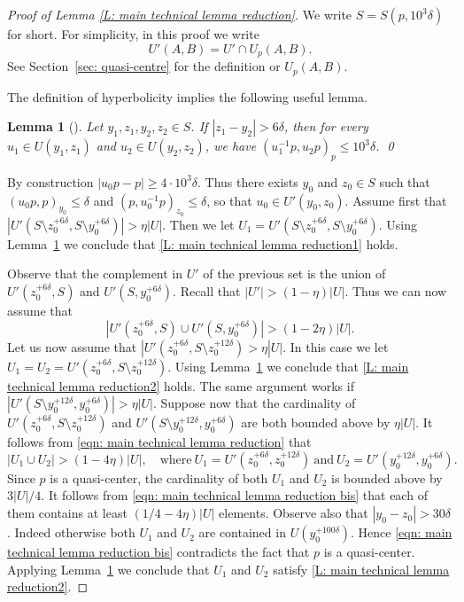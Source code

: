 \documentclass[JEP,XML,SOM,Unicode, NoEqCountersInSection,published]{cedram}
\theoremstyle{plain}
\newtheorem{lem}[thm]{Lemma}
\theoremstyle{definition}
\begin{document}
\begin{proof}[Proof of Lemma \ref{L: main technical lemma reduction}]
We write $S=S(p,10^3 \delta)$ for short.
For simplicity, in this proof we write
\[
U'(A,B) = U' \cap U_p(A,B).
\]
See Section~\ref{sec: quasi-centre} for the definition or $U_p(A,B)$.

The definition of hyperbolicity implies the following useful lemma.

\begin{lem}[{\cite[Lem.\,6.1]{delzant_product_2020}}]
\label{L: reduction 1}
Let $y_1,z_1,y_2,z_2\in S$.
If $|z_1-y_2|>6\delta$, then for every $u_1 \in U(y_1, z_1)$ and $u_2 \in U(y_2,z_2)$, we have $ (u_1^{-1}p,u_2p)_p\leqslant 10^3 \delta$. \qed
\end{lem}

By construction $|u_0p - p| \geq 4\cdot 10^3\delta$.
Thus there exists $y_0$ and $z_0 \in S$ such that $(u_0p,p)_{y_0}\leqslant \delta$ and $(p,u_0^ {-1}p)_{z_0}\leq \delta$, so that $u_0 \in U'(y_0, z_0)$.
Assume first that \hbox{$|U'(S\setminus z_0^{+6\delta},S\setminus y_0^ {+6\delta})|>\eta|U|$}.
Then we let $U_1 = U'(S\setminus z_0^{+6\delta},S\setminus y_0^ {+6\delta})$.
Using Lemma~\ref{L: reduction 1} we conclude that \eqref{L: main technical lemma reduction1} holds.

Observe that the complement in $U'$ of the previous set is the union of $U'(z_0^{+6\delta}, S)$ and $U'(S,y_0^ {+6\delta})$.
Recall that $|U'| > (1 -\eta)|U|$.
Thus we can now assume that
\begin{equation}
\label{eqn: main technical lemma reduction}
\left| U'(z_0^{+6\delta}, S) \cup U'(S,y_0^ {+6\delta}) \right| > (1-2\eta)|U|.
\end{equation}
Let us now assume that $|U'(z_0^{+6\delta}, S\setminus z_0^{+12\delta}) > \eta |U|$.
In this case we let $U_1 = U_2 = U'(z_0^{+6\delta}, S\setminus z_0^{+12\delta})$.
Using Lemma~\ref{L: reduction 1} we conclude that \eqref{L: main technical lemma reduction2} holds.
The same argu\-ment works if $|U'(S\setminus y_0^ {+12\delta},y_0^ {+6\delta})| > \eta|U|$.
Suppose now that the cardinality of \hbox{$U'(z_0^{+6\delta}, S\setminus z_0^{+12\delta})$} and $U'(S\setminus y_0^ {+12\delta},y_0^ {+6\delta})$ are both bounded above by $\eta |U|$.
It follows from \eqref{eqn: main technical lemma reduction} that
\begin{equation}
\label{eqn: main technical lemma reduction bis}
\left| U_1 \cup U_2 \right| > (1-4\eta)|U|, \quad
\text{where}\ U_1 \!=\! U'(z_0^{+6\delta}, z_0^{+12\delta})\ \text{and}\ U_2 \!=\! U'(y_0^ {+12\delta},y_0^ {+6\delta}).
\end{equation}
Since $p$ is a quasi-center, the cardinality of both $U_1$ and $U_2$ is bounded above by $3|U|/4$.
It follows from \eqref{eqn: main technical lemma reduction bis} that each of them contains at least $(1/4 - 4\eta)|U|$ elements.
Observe also that $|y_0 - z_0| > 30\delta$.
Indeed otherwise both $U_1$ and $U_2$ are contained in $U(y_0^{+100\delta})$.
Hence \eqref{eqn: main technical lemma reduction bis} contradicts the fact that $p$ is a quasi-center.
Applying Lemma~\ref{L: reduction 1} we conclude that $U_1$ and $U_2$ satisfy \eqref{L: main technical lemma reduction2}.
\end{proof}
\end{document}
